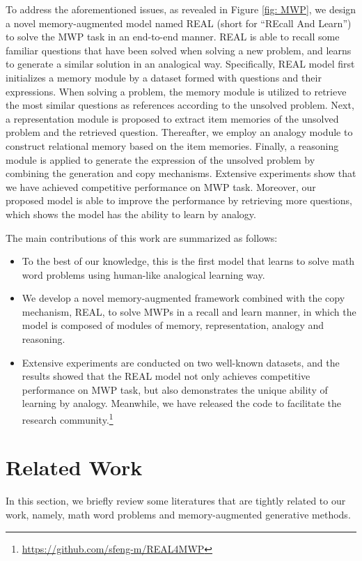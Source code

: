 \documentclass[11pt, a4paper]{article}
\begin{document}
To address the aforementioned issues, as revealed in Figure \ref{fig: MWP}, we design a novel memory-augmented model named REAL (short for ``REcall And Learn'') to solve the MWP task in an end-to-end manner. REAL is able to recall some familiar questions that have been solved when solving a new problem, and learns to generate a similar solution in an analogical way. Specifically, REAL model first initializes a memory module by a dataset formed with questions and their expressions. When solving a problem, the memory module is utilized to retrieve the most similar questions as references according to the unsolved problem. Next, a representation module is proposed to extract item memories of the unsolved problem and the retrieved question. Thereafter, we employ an analogy module to construct relational memory based on the item memories. Finally, a reasoning module is applied to generate the expression of the unsolved problem by combining the generation and copy mechanisms. Extensive experiments show that we have achieved competitive performance on MWP task. Moreover, our proposed model is able to improve the performance by retrieving more questions, which shows the model has the ability to learn by analogy.

The main contributions of this work are summarized as follows:
\begin{itemize}
	\item{To the best of our knowledge, this is the first model that learns to solve math word problems using human-like analogical learning way.}
	\item{We develop a novel memory-augmented framework combined with the copy mechanism, REAL, to solve MWPs in a recall and learn manner, in which the model is composed of modules of memory, representation, analogy and reasoning.}
	\item{Extensive experiments are conducted on two well-known datasets, and the results showed that the REAL model not only achieves competitive performance on MWP task, but also demonstrates the unique ability of learning by analogy. Meanwhile, we have released the code to facilitate the research community.\footnote{\url{https://github.com/sfeng-m/REAL4MWP}}}
\end{itemize}

\section{Related Work}
In this section, we briefly review some literatures that are tightly related to our work, namely, math word problems and memory-augmented generative methods.
\end{document}

